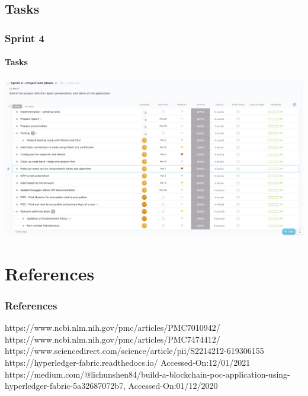 \documentclass[english,hangout]{beamer}
\begin{document}
\subsection{Tasks}

\begin{frame}[fragile]
 \frametitle{Sprint 4}
 \framesubtitle{Tasks}
    \begin{center}
        \vspace{-1.2em}
            \includegraphics[height=7cm]{Sprint4tasks.png}
    \end{center}
\end{frame}



\section{References}

\begin{frame}
\frametitle{References}
\begin{thebibliography}{00}
 https://www.ncbi.nlm.nih.gov/pmc/articles/PMC7010942/
 https://www.ncbi.nlm.nih.gov/pmc/articles/PMC7474412/
 https://www.sciencedirect.com/science/article/pii/S2214212-619306155
 https://hyperledger-fabric.readthedocs.io/ Accessed-On:12/01/2021
 https://medium.com/@lichunshen84/build-a-blockchain-poc-application-using-hyperledger-fabric-5a32687072b7, Accessed-On:01/12/2020
\end{thebibliography}

\end{frame}
\end{document}

